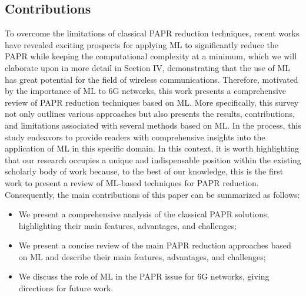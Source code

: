 \documentclass[conference]{IEEEtran}
\begin{document}
\subsection{Contributions}
To overcome the limitations of classical PAPR reduction techniques, recent works have revealed exciting prospects for applying ML to significantly reduce the PAPR while keeping the computational complexity at a minimum, which we will elaborate upon in more detail in Section IV, demonstrating that the use of ML has great potential for the field of wireless communications. Therefore, motivated by the importance of ML to 6G networks, this work presents a comprehensive review of PAPR reduction techniques based on ML. More specifically, this survey not only outlines various approaches but also presents the results, contributions, and limitations associated with several methods based on ML. In the process, this study endeavors to provide readers with comprehensive insights into the application of ML in this specific domain. In this context, it is worth highlighting that our research occupies a unique and indispensable position within the existing scholarly body of work because, to the best of our knowledge, this is the first work to present a review of ML-based techniques for PAPR reduction. Consequently, the main contributions of this paper can be summarized as follows:
\begin{itemize}
    \item We present a comprehensive analysis of the classical PAPR solutions, highlighting their main features, advantages, and challenges;
    \item We present a concise review of the main PAPR reduction approaches based on ML and describe their main features, advantages, and challenges;
    \item We discuss the role of ML in the PAPR issue for 6G networks, giving directions for future work.
\end{itemize}
\end{document}
